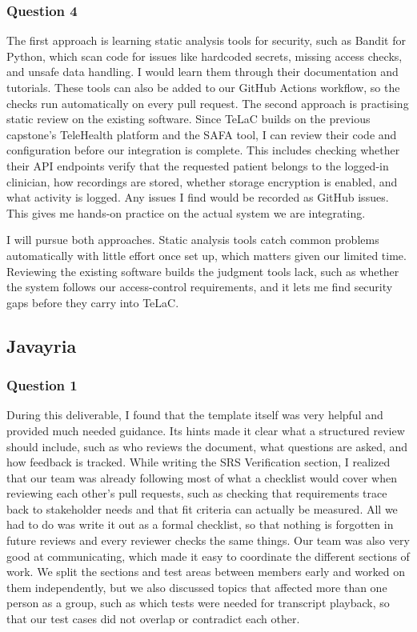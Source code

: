 \documentclass[12pt, titlepage]{article}
\renewcommand{\_}{\oldunderscore\allowbreak}
\begin{document}
\subsubsection*{Question 4}
The first approach is learning static analysis tools for security, such as Bandit for Python, which scan code for issues like hardcoded secrets, missing access checks, and unsafe data handling. I would learn them through their documentation and tutorials. These tools can also be added to our GitHub Actions workflow, so the checks run automatically on every pull request.
The second approach is practising static review on the existing software. Since TeLaC builds on the previous capstone’s TeleHealth platform and the SAFA tool, I can review their code and configuration before our integration is complete. This includes checking whether their API endpoints verify that the requested patient belongs to the logged-in clinician, how recordings are stored, whether storage encryption is enabled, and what activity is logged. Any issues I find would be recorded as GitHub issues. This gives me hands-on practice on the actual system we are integrating.

I will pursue both approaches. Static analysis tools catch common problems automatically with little effort once set up, which matters given our limited time. Reviewing the existing software builds the judgment tools lack, such as whether the system follows our access-control requirements, and it lets me find security gaps before they carry into TeLaC.

\subsection*{Javayria}
\subsubsection*{Question 1}
During this deliverable, I found that the template itself was very helpful and provided much needed guidance. 
Its hints made it clear what a structured review should include, such as who reviews the document, what questions are asked, and how feedback is tracked. 
While writing the SRS Verification section, I realized that our team was already following most of what a checklist would cover when reviewing each other's pull requests, such as checking that requirements trace back to stakeholder needs and that fit criteria can actually be measured. 
All we had to do was write it out as a formal checklist, so that nothing is forgotten in future reviews and every reviewer checks the same things. 
Our team was also very good at communicating, which made it easy to coordinate the different sections of work. 
We split the sections and test areas between members early and worked on them independently, but we also discussed topics that affected more than one person as a group, such as which tests were needed for transcript playback, so that our test cases did not overlap or contradict each other.
\end{document}
